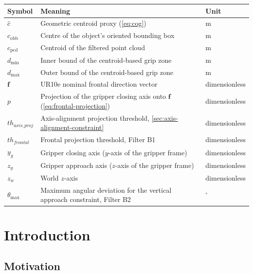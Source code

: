 \documentclass[oneside,studentpaper]{wbk}
\begin{document}
\begin{longtable}{@{}p{}p{}p{}@{}}
\toprule
\textbf{Symbol} & \textbf{Meaning} & \textbf{Unit} \\
\midrule
\endhead
$\hat{c}$ & Geometric centroid proxy (\cref{eq:cog}) & m \\
$c_{\mathrm{obb}}$ & Centre of the object's oriented bounding box & m \\
$c_{\mathrm{pcd}}$ & Centroid of the filtered point cloud & m \\
$d_{\min}$ & Inner bound of the centroid-based grip zone & m \\
$d_{\max}$ & Outer bound of the centroid-based grip zone & m \\
$\mathbf{f}$ & UR10e nominal frontal direction vector & dimensionless \\
$p$ & Projection of the gripper closing axis onto $\mathbf{f}$ (\cref{eq:frontal-projection}) & dimensionless \\
$th_{axis\_proj}$ & Axis-alignment projection threshold, \cref{sec:axis-alignment-constraint} & dimensionless \\
$th_{frontal}$ & Frontal projection threshold, Filter B1 & dimensionless \\
$y_g$ & Gripper closing axis ($y$-axis of the gripper frame) & dimensionless \\
$z_g$ & Gripper approach axis ($z$-axis of the gripper frame) & dimensionless \\
$z_w$ & World $z$-axis & dimensionless \\
$\theta_{\max}$ & Maximum angular deviation for the vertical approach constraint, Filter B2 & $^{\circ}$ \\
\bottomrule
\end{longtable}

\newpage


\mainmatter

\chapter{Introduction}

\section{Motivation}
\label{sec:motivation}
\end{document}

